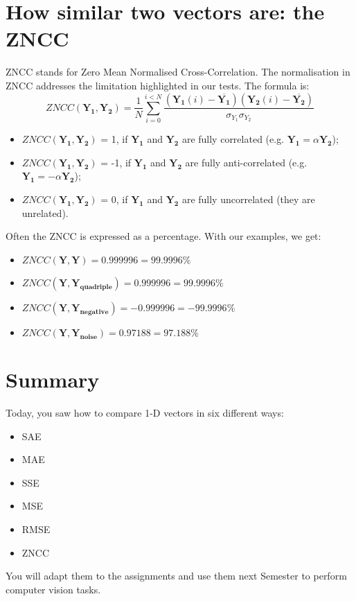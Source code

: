 \documentclass[english,a4paper,12pt,oneside]{article}
\begin{document}
\section{How similar two vectors are: the ZNCC}

ZNCC stands for Zero Mean Normalised Cross-Correlation. 
The normalisation in ZNCC addresses the limitation highlighted in our tests. 
The formula is:
\begin{equation}
ZNCC(\mathbf{Y_1}, \mathbf{Y_2}) = \frac{1}{N}\sum^{i < N}_{i=0} \frac{(\mathbf{Y_1}(i)-\overline{\mathbf{Y_1}})(\mathbf{Y_2}(i)-\overline{\mathbf{Y_2}})}{\sigma_{Y_1}\sigma_{Y_2}}
\end{equation}
\begin{itemize}
\item $ZNCC(\mathbf{Y_1}, \mathbf{Y_2})$ = 1, if $\mathbf{Y_1}$ and $\mathbf{Y_2}$ are fully correlated (e.g. $\mathbf{Y_1} = \alpha \mathbf{Y_2}$);
\item $ZNCC(\mathbf{Y_1}, \mathbf{Y_2})$ = -1, if $\mathbf{Y_1}$ and $\mathbf{Y_2}$ are fully anti-correlated (e.g. $\mathbf{Y_1} = -\alpha \mathbf{Y_2}$);
\item $ZNCC(\mathbf{Y_1}, \mathbf{Y_2})$ = 0, if $\mathbf{Y_1}$ and $\mathbf{Y_2}$ are fully uncorrelated (they are unrelated).
\end{itemize}
Often the ZNCC is expressed as a percentage. 
With our examples, we get:
\begin{itemize}
\item $ZNCC(\mathbf{Y}, \mathbf{Y}) = 0.999996 =	99.9996\%$
\item $ZNCC(\mathbf{Y}, \mathbf{Y_{quadriple}}) = 0.999996 =	99.9996\%$
\item $ZNCC(\mathbf{Y}, \mathbf{Y_{negative}}) = -0.999996 =	-99.9996\%$
\item $ZNCC(\mathbf{Y}, \mathbf{Y_{noise}}) =  0.97188 =	97.188\%$
\end{itemize}


\section{Summary}

Today, you saw how to compare 1-D vectors in six different ways:
\begin{itemize}
\item SAE
\item MAE
\item SSE
\item MSE
\item RMSE
\item ZNCC
\end{itemize}
You will adapt them to the assignments and use them next Semester to perform computer vision tasks.
\end{document}
